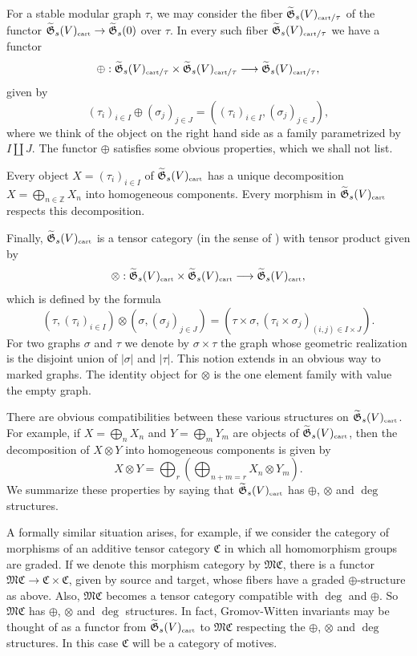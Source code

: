 \documentclass[11pt]{amsart}
\theoremstyle{definition}
\theoremstyle{remark}
\renewcommand{\tilde}{\widetilde}
\newcommand{\cart}{{\mbox{\tiny cart}}}
\newcommand{\GG}{{\mathfrak{G}}}
\newcommand{\MM}{{\mathfrak{M}}}
\newcommand{\CC}{{\mathfrak{C}}}
\newcommand{\zz}{{\mathbb{Z}}}
\theoremstyle{plain}
\theoremstyle{definition}
\theoremstyle{remark}
\begin{document}
For a stable modular graph \(\tau\), we may consider the fiber
\(\tilde{\GG}_s(V)_{\cart/\tau}\) of the functor
\(\tilde{\GG}_s(V)_\cart\rightarrow\tilde{\GG}_s(0)\) over \(\tau\). In every such
fiber \(\tilde{\GG}_s(V)_{\cart/\tau}\) we
have a functor
\[
\oplus:\tilde{\GG}_s(V)_{\cart/\tau}\times\tilde{\GG}_s(V)_{\cart/\tau}
\longrightarrow\tilde{\GG}_s(V)_{\cart/\tau},
\]
given by
\[
(\tau_i)_{i\in I}\oplus(\sigma_j)_{j\in J}=((\tau_i)_{i\in
I},(\sigma_j)_{j\in J}),
\]
where we think of the object on the right hand side as a family parametrized by
\(I\amalg J\). The functor \(\oplus\)
satisfies some obvious properties, which we shall not list.

Every object \(X=(\tau_i)_{i\in I}\) of \(\tilde{\GG}_s(V)_\cart\) has a unique
decomposition \(X=\bigoplus_{n\in\zz}X_n\)
into homogeneous components. Every morphism in \(\tilde{\GG}_s(V)_\cart\)
respects this decomposition.

Finally, \(\tilde{\GG}_s(V)_\cart\) is a tensor category (in the sense of
\cite{delmil}) with tensor product given by
\[
\otimes:\tilde{\GG}_s(V)_{\cart}\times\tilde{\GG}_s(V)_{\cart}
\longrightarrow \tilde{\GG}_s(V)_{\cart},
\]
which is defined by the formula
\[
(\tau,(\tau_i)_{i\in I})\otimes(\sigma,(\sigma_j)_{j\in
J})=(\tau\times\sigma,(\tau_i\times\sigma_j)_{(i,j)\in I\times
J}).
\]
For two graphs \(\sigma\) and \(\tau\) we denote by \(\sigma\times\tau\) the graph
whose geometric realization is the
disjoint union of \(|\sigma|\) and \(|\tau|\). This notion extends in an obvious
way to marked graphs. The identity object
for \(\otimes\) is the one element family with value the empty graph.

There are obvious compatibilities between these various structures on
\(\tilde{\GG}_s(V)_\cart\). For example, if
\(X=\bigoplus_nX_n\) and \(Y=\bigoplus_mY_m\) are objects of
\(\tilde{\GG}_s(V)_\cart\), then the decomposition of \(X\otimes
Y\) into homogeneous components is given by
\[
X\otimes Y=\bigoplus_r\left(\bigoplus_{n+m=r}X_n\otimes Y_m\right).
\]
We summarize these properties by saying that \(\tilde{\GG}_s(V)_\cart\) has
\(\oplus\), \(\otimes\) and \(\deg\) structures.

A formally similar situation arises, for example, if we consider the category
of morphisms of an additive tensor
category \(\CC\) in which all homomorphism groups are graded.  If we denote this
morphism category by \(\MM\CC\), there is a
functor \(\MM\CC\rightarrow\CC\times\CC\), given by source and target, whose
fibers have a graded \(\oplus\)-structure as
above. Also, \(\MM\CC\) becomes a tensor category compatible with \(\deg\) and
\(\oplus\). So \(\MM\CC\) has \(\oplus\), \(\otimes\)
and \(\deg\) structures. In fact, Gromov-Witten invariants may be thought of as a
functor from \(\tilde{\GG}_s(V)_\cart\) to
\(\MM\CC\) respecting the \(\oplus\), \(\otimes\) and \(\deg\) structures. In this case
\(\CC\) will be a category of motives.
\end{document}
